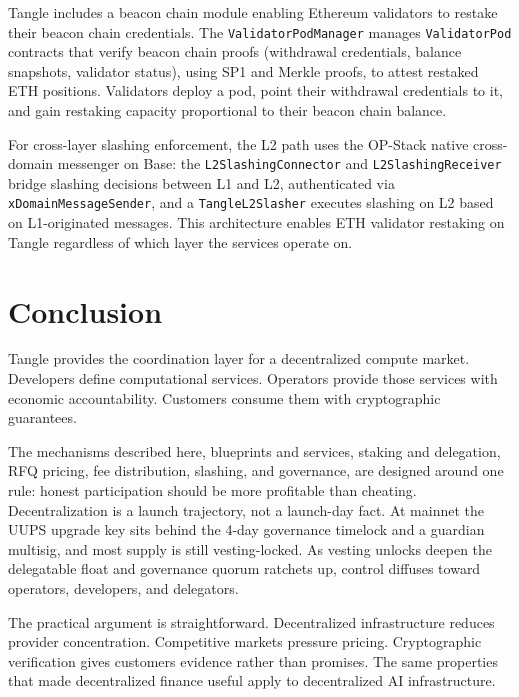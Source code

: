 \documentclass[11pt,a4paper]{article}
\begin{document}
Tangle includes a beacon chain module enabling Ethereum validators to restake their beacon chain credentials. The \texttt{ValidatorPodManager} manages \texttt{ValidatorPod} contracts that verify beacon chain proofs (withdrawal credentials, balance snapshots, validator status), using SP1 and Merkle proofs, to attest restaked ETH positions. Validators deploy a pod, point their withdrawal credentials to it, and gain restaking capacity proportional to their beacon chain balance.

For cross-layer slashing enforcement, the L2 path uses the OP-Stack native cross-domain messenger on Base: the \texttt{L2SlashingConnector} and \texttt{L2SlashingReceiver} bridge slashing decisions between L1 and L2, authenticated via \texttt{xDomainMessageSender}, and a \texttt{TangleL2Slasher} executes slashing on L2 based on L1-originated messages. This architecture enables ETH validator restaking on Tangle regardless of which layer the services operate on.

\section{Conclusion}

Tangle provides the coordination layer for a decentralized compute market. Developers define computational services. Operators provide those services with economic accountability. Customers consume them with cryptographic guarantees.

The mechanisms described here, blueprints and services, staking and delegation, RFQ pricing, fee distribution, slashing, and governance, are designed around one rule: honest participation should be more profitable than cheating. Decentralization is a launch trajectory, not a launch-day fact. At mainnet the UUPS upgrade key sits behind the 4-day governance timelock and a guardian multisig, and most supply is still vesting-locked. As vesting unlocks deepen the delegatable float and governance quorum ratchets up, control diffuses toward operators, developers, and delegators.

The practical argument is straightforward. Decentralized infrastructure reduces provider concentration. Competitive markets pressure pricing. Cryptographic verification gives customers evidence rather than promises. The same properties that made decentralized finance useful apply to decentralized AI infrastructure.
\end{document}
